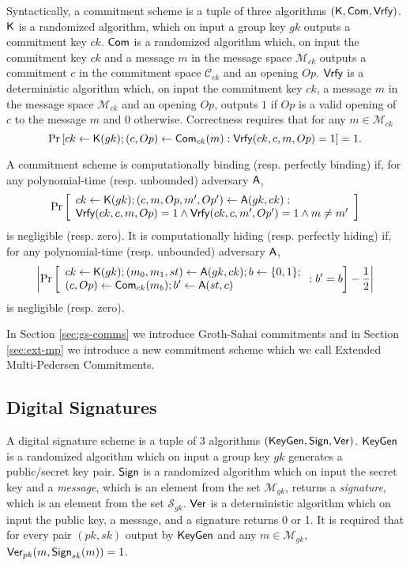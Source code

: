 Syntactically, a commitment scheme is a tuple of three algorithms $(\mathsf{K},\mathsf{Com},\mathsf{Vrfy})$. $\mathsf{K}$ is a randomized algorithm, which on input a group key $gk$ outputs a commitment key $ck$. $\mathsf{Com}$ is a randomized algorithm which, on input the commitment key $ck$ and a message $m$ in the message space $\mathcal{M}_{ck}$ outputs a commitment $c$ in the commitment space $\mathcal{C}_{ck}$ and an opening $Op$. $\mathsf{Vrfy}$ is a deterministic algorithm which, on input the commitment key $ck$, a message $m$ in the message space $\mathcal{M}_{ck}$ and an opening $Op$, outputs $1$ if $Op$ is a valid opening of $c$ to the message $m$ and $0$ otherwise. 
Correctness requires that for any $m \in \mathcal{M}_{ck}$
$$\Pr\left[ck \gets \mathsf{K}(gk); 
(c, Op) \gets \mathsf{Com}_{ck}(m): \mathsf{Vrfy}(ck,c,m,Op)=1 \right]=1.$$

\begin{definition}  A commitment scheme is computationally binding (resp. perfectly binding) if, for any polynomial-time (resp. unbounded)  adversary $\mathsf{A}$, 
	$$\Pr\left[\begin{array}{l} ck \gets \mathsf{K}(gk); (c,m,Op,m',Op') \gets \mathsf{A}(gk,ck):\\ \mathsf{Vrfy}(ck,c,m,Op)=1 \wedge \mathsf{Vrfy}(ck,c,m',Op')=1 \wedge m\neq m'\end{array}\right] $$
	is negligible (resp. zero).  It is computationally hiding (resp. perfectly hiding)  if, for any polynomial-time (resp. unbounded) adversary $\mathsf{A}$,
	$$\left|\Pr\left[ \begin{array}{l} ck \gets \mathsf{K}(gk); (m_0,m_1,st) \gets \mathsf{A}(gk,ck); b \gets \{0,1\};\\ (c,Op) \gets \mathsf{Com}_{ck}(m_b); b' \gets \mathsf{A}(st,c)
                      \end{array} : b'=b\right] -\dfrac{1}{2} \right|$$
	is negligible (resp. zero).
\end{definition}

In Section \ref{sec:gs-comms} we introduce Groth-Sahai commitments and in Section \ref{sec:ext-mp} we introduce a new commitment scheme which we call Extended Multi-Pedersen Commitments.

\subsection{Digital Signatures} \label{sec:uf-cma} \label{sec:ots}

A digital signature scheme is a tuple of 3 algorithms $(\mathsf{KeyGen},\mathsf{Sign},\mathsf{Ver})$. $\mathsf{KeyGen}$ is a randomized algorithm which on input a group key $gk$ generates a public/secret key pair. $\mathsf{Sign}$ is a randomized algorithm which on input the secret key and a \emph{message}, which is an element from the set $\mathcal{M}_{gk}$, returns a \emph{signature}, which is an element from the set $\mathcal{S}_{gk}$. $\mathsf{Ver}$ is a deterministic algorithm which on input the public key, a message, and a signature returns 0 or 1. It is required that for every pair $(pk,sk)$ output by $\mathsf{KeyGen}$ and any $m\in\mathcal{M}_{gk}$, $\mathsf{Ver}_{pk}(m,\mathsf{Sign}_{sk}(m))=1$.

